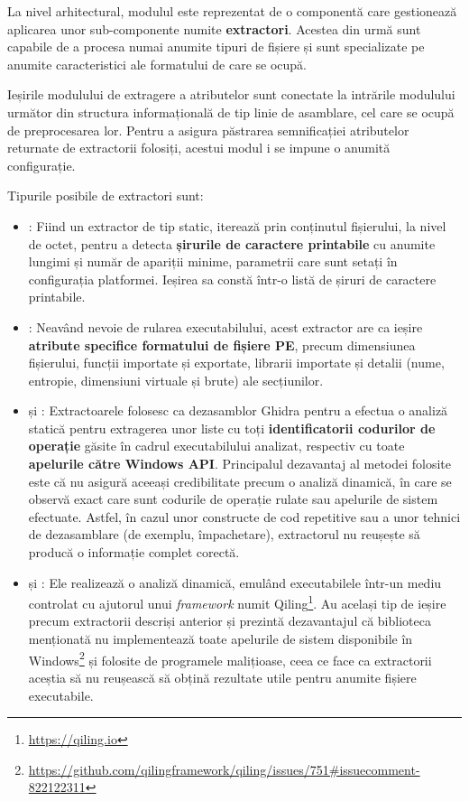 \documentclass[../../main.tex]{subfiles}
\begin{document}
La nivel arhitectural, modulul este reprezentat de o componentă care gestionează aplicarea unor sub-componente numite \textbf{extractori}. Acestea din urmă sunt capabile de a procesa numai anumite tipuri de fișiere și sunt specializate pe anumite caracteristici ale formatului de care se ocupă.

Ieșirile modulului de extragere a atributelor sunt conectate la intrările modulului următor din structura informațională de tip linie de asamblare, cel care se ocupă de preprocesarea lor. Pentru a asigura păstrarea semnificației atributelor returnate de extractorii folosiți, acestui modul i se impune o anumită configura\-ție.

Tipurile posibile de extractori sunt:

\begin{itemize}
    \item {}: Fiind un extractor de tip static, iterează prin conținutul fișierului, la nivel de octet, pentru a detecta \textbf{șirurile de caractere prin\-tabile} cu anumite lungimi și număr de apariții minime, parametrii care sunt setați în configurația platformei. Ieșirea sa constă într-o listă de șiruri de caractere printabile.
    \item {}: Neavând nevoie de rularea executabilului, acest extractor are ca ieșire \textbf{atribute specifice formatului de fișiere PE}, precum dimensiunea fișierului, funcții importate și exportate, librarii importate și detalii (nume, entropie, dimensiuni virtuale și brute) ale secțiunilor.
    \item {} și : Extractoarele folosesc ca dezasamblor Ghidra pentru a efectua o analiză statică pentru extragerea unor liste cu toți \textbf{identificatorii codurilor de operație} găsite în cadrul executabilului analizat, respectiv cu toate \textbf{apelurile către Windows API}. Principalul dezavantaj al metodei folosite este că nu asigură aceeași credibilitate precum o analiză dinamică, în care se observă exact care sunt codurile de operație rulate sau apelurile de sistem efectuate. Astfel, în cazul unor constructe de cod repetitive sau a unor tehnici de dezasamblare (de exemplu, împachetare), extractorul nu reușește să producă o informație complet corectă.
    \item {} și : Ele realizează o analiză dinamică, emu\-lând executabilele într-un mediu controlat cu ajutorul unui \textit{framework} numit Qiling\footnote{\href{https://qiling.io}{https://qiling.io}}. Au același tip de ieșire precum extractorii descriși anterior și prezintă dezavantajul că biblioteca menționată nu implementează toate apelurile de sistem disponibile în Windows\footnote{\href{https://github.com/qilingframework/qiling/issues/751\#issuecomment-822122311}{https://github.com/qilingframework/qiling/issues/751\#issuecomment-822122311}} și folosite de programele malițioase, ceea ce face ca extractorii aceștia să nu reușească să obțină rezultate utile pentru anumite fișiere executabile.

\end{itemize}
\end{document}
